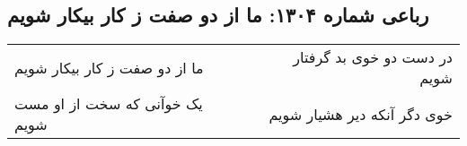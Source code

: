 \begin{center}
\section*{رباعی شماره ۱۳۰۴: ما از دو صفت ز کار بیکار شویم}
\label{sec:1304}
\begin{longtable}{l p{0.5cm} r}
ما از دو صفت ز کار بیکار شویم
&&
در دست دو خوی بد گرفتار شویم
\\
یک خوآنی که سخت از او مست شویم
&&
خوی دگر آنکه دیر هشیار شویم
\\
\end{longtable}
\end{center}
